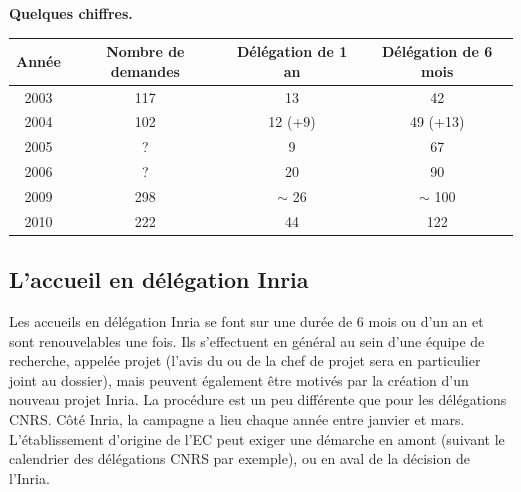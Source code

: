 \quad

\textbf{Quelques chiffres.}
% 
\begin{center}
\begin{tabular}{*{4}{c}}
\toprule
Ann\'ee & Nombre de demandes & D\'el\'egation de 1 an & D\'el\'egation de 6 mois   \\
\midrule
2003    & 117                             &  13                          &  42                              \\ 
2004    &102                              &  12  (+9)                 &  49  (+13)                   \\ 
2005    &   ?                               &   9                            &  67                               \\ 
2006    &   ?                               & 20                            &  90                              \\ 
2009    &  298                               &  $\sim$ 26                &   $\sim$   100                 \\ 
2010  & 222                               &  44                           & 122                             \\ 
\bottomrule
\end{tabular}
\end{center}



\subsection*{L'accueil en d\'el\'egation Inria}


Les accueils en d\'el\'egation Inria se font sur une dur\'ee de 6 mois ou
d'un an et sont renouvelables une fois. Ils s'effectuent en
g\'en\'eral au sein d'une \'equipe de recherche, appel\'ee projet
(l'avis du ou de la chef de projet sera en particulier joint au dossier),
mais peuvent \'egalement \^etre motiv\'es par la cr\'eation d'un
nouveau projet Inria. La proc\'edure est un peu diff\'erente que
pour les d\'el\'egations CNRS. C\^ot\'e Inria, la campagne a lieu chaque ann\'ee entre janvier et mars.
L'\'etablissement d'origine de l'EC peut exiger une d\'emarche en amont (suivant le calendrier des d\'el\'egations CNRS par exemple), 
ou en aval de la d\'ecision de l'Inria. 

